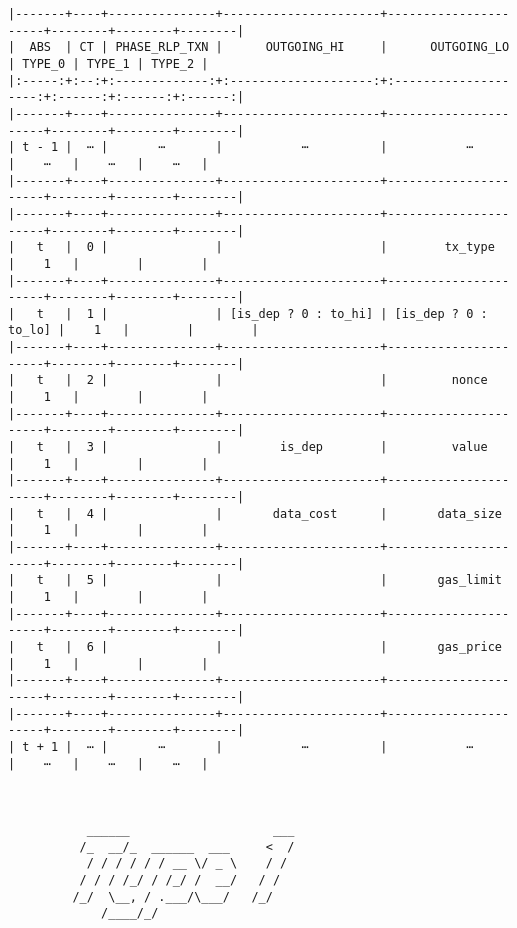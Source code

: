 \documentclass[varwidth=\maxdimen,margin=0.5cm,multi={verbatim}]{standalone}
\begin{document}
\begin{verbatim}
|-------+----+---------------+----------------------+----------------------+--------+--------+--------|
|  ABS  | CT | PHASE_RLP_TXN |      OUTGOING_HI     |      OUTGOING_LO     | TYPE_0 | TYPE_1 | TYPE_2 |
|:-----:+:--:+:-------------:+:--------------------:+:--------------------:+:------:+:------:+:------:|
|-------+----+---------------+----------------------+----------------------+--------+--------+--------|
| t - 1 |  ⋯ |       ⋯       |           ⋯          |           ⋯          |    ⋯   |    ⋯   |    ⋯   |
|-------+----+---------------+----------------------+----------------------+--------+--------+--------|
|-------+----+---------------+----------------------+----------------------+--------+--------+--------|
|   t   |  0 |               |                      |        tx_type       |    1   |        |        |
|-------+----+---------------+----------------------+----------------------+--------+--------+--------|
|   t   |  1 |               | [is_dep ? 0 : to_hi] | [is_dep ? 0 : to_lo] |    1   |        |        |
|-------+----+---------------+----------------------+----------------------+--------+--------+--------|
|   t   |  2 |               |                      |         nonce        |    1   |        |        |
|-------+----+---------------+----------------------+----------------------+--------+--------+--------|
|   t   |  3 |               |        is_dep        |         value        |    1   |        |        |
|-------+----+---------------+----------------------+----------------------+--------+--------+--------|
|   t   |  4 |               |       data_cost      |       data_size      |    1   |        |        |
|-------+----+---------------+----------------------+----------------------+--------+--------+--------|
|   t   |  5 |               |                      |       gas_limit      |    1   |        |        |
|-------+----+---------------+----------------------+----------------------+--------+--------+--------|
|   t   |  6 |               |                      |       gas_price      |    1   |        |        |
|-------+----+---------------+----------------------+----------------------+--------+--------+--------|
|-------+----+---------------+----------------------+----------------------+--------+--------+--------|
| t + 1 |  ⋯ |       ⋯       |           ⋯          |           ⋯          |    ⋯   |    ⋯   |    ⋯   |



           ______                    ___
          /_  __/_  ______  ___     <  /
           / / / / / / __ \/ _ \    / / 
          / / / /_/ / /_/ /  __/   / /  
         /_/  \__, / .___/\___/   /_/   
             /____/_/



\end{verbatim}
\end{document}

